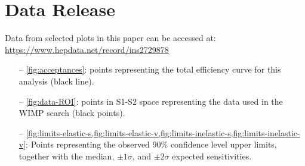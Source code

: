 \documentclass[reprint, showpacs,
preprintnumbers,
amsmath,amssymb,
aps, floatfix,
superscriptaddress,
prd, nofootinbib]{revtex4-1}
\begin{document}
\newpage
\section{Data Release\label{ap:2}}
Data from selected plots in this paper can be accessed at: \href{https://www.hepdata.net/record/ins2729878}{https://www.hepdata.net/record/ins2729878}

\begin{itemize}
    \item[--] \autoref{fig:acceptances}:
   points representing the total efficiency curve for this analysis (black line).
    \item[--] \autoref{fig:data-ROI}: points in S1-S2 space representing the data used in the WIMP search (black points).
    \item[--] \cref{fig:limits-elastic-s,fig:limits-elastic-v,fig:limits-inelastic-s,fig:limits-inelastic-v}: Points representing the observed 90\% confidence level upper limits, together with the median, $\pm1\sigma$, and $\pm2\sigma$ expected sensitivities.
\end{itemize}


\end{document}
